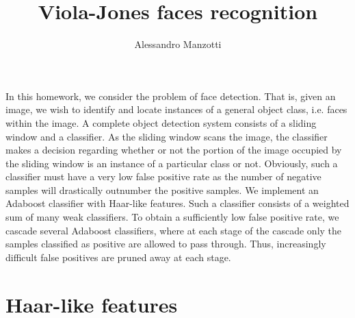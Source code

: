 \documentclass[11pt]{amsart}
\title{Viola-Jones faces recognition}
\author{Alessandro Manzotti}
\begin{document}
\maketitle

In this homework, we consider the problem of face detection. That is, given an image, we wish to identify and locate instances of a general object class, i.e. faces within the image. A complete object detection system consists of a sliding window and a classifier. As the sliding window scans the image, the classifier makes a decision regarding whether or not the portion of the image occupied by the sliding window is an instance of a particular class or not. Obviously, such a classifier must have a very low false positive rate as the number of negative samples will drastically outnumber the positive samples.
We implement an Adaboost classifier with Haar-like features. Such a classifier consists of a weighted sum of many weak classifiers. To obtain a sufficiently low false positive rate, we cascade several Adaboost classifiers, where at each stage of the cascade only the samples classified as positive are allowed to pass through. Thus, increasingly difficult false positives are pruned away at each stage.

\section{Haar-like features}
\end{document}
